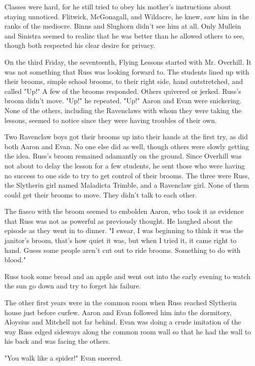 Classes were hard, for he still tried to obey his mother's instructions about staying unnoticed. Flitwick, McGonagall, and Wildacre, he knew, saw him in the ranks of the mediocre. Binns and Slughorn didn't see him at all. Only Mullein and Sinistra seemed to realize that he was better than he allowed others to see, though both respected his clear desire for privacy.

On the third Friday, the seventeenth, Flying Lessons started with Mr. Overhill. It was not something that Russ was looking forward to. The students lined up with their brooms, simple school brooms, to their right side, hand outstretched, and called "Up!" A few of the brooms responded. Others quivered or jerked. Russ's broom didn't move. "Up!" he repeated. "Up!" Aaron and Evan were snickering. None of the others, including the Ravenclaws with whom they were taking the lessons, seemed to notice since they were having troubles of their own.

Two Ravenclaw boys got their brooms up into their hands at the first try, as did both Aaron and Evan. No one else did as well, though others were slowly getting the idea. Russ's broom remained adamantly on the ground. Since Overhill was not about to delay the lesson for a few students, he sent those who were having no success to one side to try to get control of their brooms. The three were Russ, the Slytherin girl named Maladicta Trimble, and a Ravenclaw girl. None of them could get their brooms to move. They didn't talk to each other.

The fiasco with the broom seemed to embolden Aaron, who took it as evidence that Russ was not as powerful as previously thought. He laughed about the episode as they went in to dinner. "I swear, I was beginning to think it was the janitor's broom, that's how quiet it was, but when I tried it, it came right to hand. Guess some people aren't cut out to ride brooms. Something to do with blood."

Russ took some bread and an apple and went out into the early evening to watch the sun go down and try to forget his failure.

The other first years were in the common room when Russ reached Slytherin house just before curfew. Aaron and Evan followed him into the dormitory, Aloysius and Mitchell not far behind. Evan was doing a crude imitation of the way Russ edged sideways along the common room wall so that he had the wall to his back and was facing the others.

"You walk like a spider!" Evan sneered.

